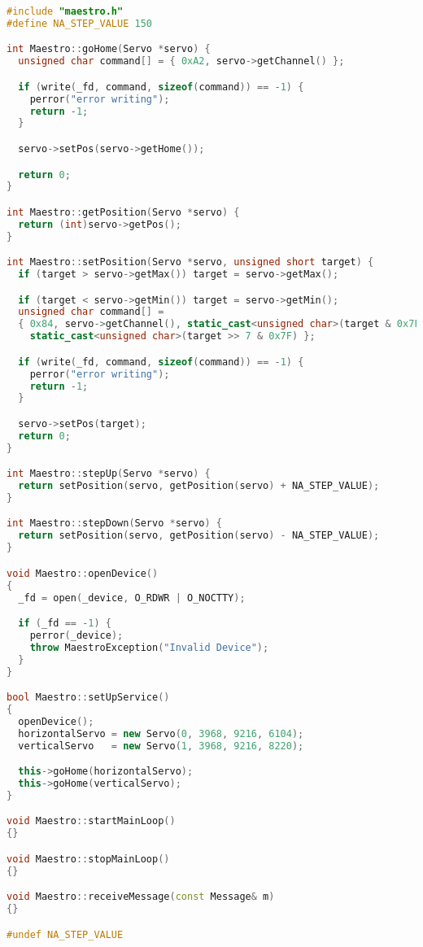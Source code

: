 \begin{lstlisting}[caption=maestro.cpp,language=C++]
#include "maestro.h"
#define NA_STEP_VALUE 150

int Maestro::goHome(Servo *servo) {
  unsigned char command[] = { 0xA2, servo->getChannel() };

  if (write(_fd, command, sizeof(command)) == -1) {
    perror("error writing");
    return -1;
  }

  servo->setPos(servo->getHome());

  return 0;
}

int Maestro::getPosition(Servo *servo) {
  return (int)servo->getPos();
}

int Maestro::setPosition(Servo *servo, unsigned short target) {
  if (target > servo->getMax()) target = servo->getMax();

  if (target < servo->getMin()) target = servo->getMin();
  unsigned char command[] =
  { 0x84, servo->getChannel(), static_cast<unsigned char>(target & 0x7F),
    static_cast<unsigned char>(target >> 7 & 0x7F) };

  if (write(_fd, command, sizeof(command)) == -1) {
    perror("error writing");
    return -1;
  }

  servo->setPos(target);
  return 0;
}

int Maestro::stepUp(Servo *servo) {
  return setPosition(servo, getPosition(servo) + NA_STEP_VALUE);
}

int Maestro::stepDown(Servo *servo) {
  return setPosition(servo, getPosition(servo) - NA_STEP_VALUE);
}

void Maestro::openDevice()
{
  _fd = open(_device, O_RDWR | O_NOCTTY);

  if (_fd == -1) {
    perror(_device);
    throw MaestroException("Invalid Device");
  }
}

bool Maestro::setUpService()
{
  openDevice();
  horizontalServo = new Servo(0, 3968, 9216, 6104);
  verticalServo   = new Servo(1, 3968, 9216, 8220);

  this->goHome(horizontalServo);
  this->goHome(verticalServo);
}

void Maestro::startMainLoop()
{}

void Maestro::stopMainLoop()
{}

void Maestro::receiveMessage(const Message& m)
{}

#undef NA_STEP_VALUE
\end{lstlisting}





